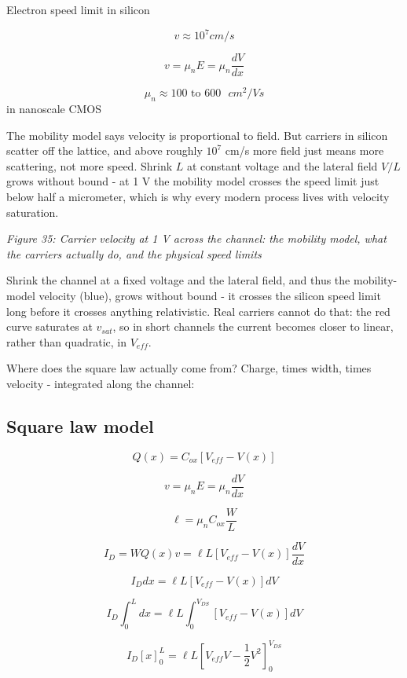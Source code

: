 Electron speed limit in silicon

\[ v \approx  10^7 cm/s \]

\[ v = \mu_n E = \mu_n \frac{dV}{dx} \]

\[ \mu_n \approx 100 \text{ to  } 600 \text{  } cm^2/Vs \] in nanoscale
CMOS

The mobility model says velocity is proportional to field. But carriers
in silicon scatter off the lattice, and above roughly \(10^7\) cm/s more
field just means more scattering, not more speed. Shrink \(L\) at
constant voltage and the lateral field \(V/L\) grows without bound - at
1 V the mobility model crosses the speed limit just below half a
micrometer, which is why every modern process lives with velocity
saturation.


{
\centering
{}
}

\emph{Figure 35: Carrier velocity at 1 V across the channel: the
mobility model, what the carriers actually do, and the physical speed
limits}

Shrink the channel at a fixed voltage and the lateral field, and thus
the mobility-model velocity (blue), grows without bound - it crosses the
silicon speed limit long before it crosses anything relativistic. Real
carriers cannot do that: the red curve saturates at \(v_{sat}\), so in
short channels the current becomes closer to linear, rather than
quadratic, in \(V_{eff}\).

Where does the square law actually come from? Charge, times width, times
velocity - integrated along the channel:

\subsection{Square law model}\label{square-law-model}

\[ Q(x) = C_{ox}\left[V_{eff} - V(x)\right] \]

\[ v = \mu_n E = \mu_n \frac{dV}{dx} \]

\[ \ell = \mu_n C_{ox} \frac{W}{L} \]

\[ I_{D} = W Q(x) v  = \ell L \left[ V_{eff} - V(x)\right] \frac{dV}{dx} \]

\[ I_{D} dx = \ell L \left[ V_{eff} - V(x)\right] dV \]

\[ I_{D} \int_0^L{dx}  = \ell L \int_0^{V_{DS}}{\left[ V_{eff} - V(x)\right] dV} \]

\[ I_{D} \left[x\right]_0^L = \ell L \left[V_{eff}V - \frac{1}{2}V^2\right]_0^{V_{DS}} \]

